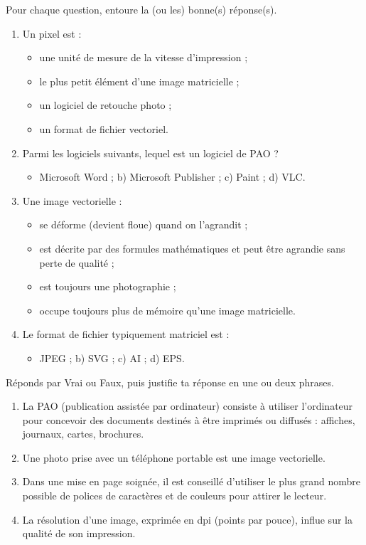 \documentclass[11pt]{article}
\newcommand{\cle}[1]{{\popxbold\color{popdark}#1}}
\begin{document}
\begin{exercice}
Pour chaque question, entoure la (ou les) bonne(s) réponse(s).
\begin{enumerate}
\item Un \cle{pixel} est :
\begin{itemize}
\item[a)] une unité de mesure de la vitesse d'impression ;
\item[b)] le plus petit élément d'une image matricielle ;
\item[c)] un logiciel de retouche photo ;
\item[d)] un format de fichier vectoriel.
\end{itemize}
\item Parmi les logiciels suivants, lequel est un logiciel de \cle{PAO} ?
\begin{itemize}
\item[a)] Microsoft Word ; b) Microsoft Publisher ; c) Paint ; d) VLC.
\end{itemize}
\item Une image \cle{vectorielle} :
\begin{itemize}
\item[a)] se déforme (devient floue) quand on l'agrandit ;
\item[b)] est décrite par des formules mathématiques et peut être agrandie sans perte de qualité ;
\item[c)] est toujours une photographie ;
\item[d)] occupe toujours plus de mémoire qu'une image matricielle.
\end{itemize}
\item Le format de fichier typiquement \cle{matriciel} est :
\begin{itemize}
\item[a)] JPEG ; b) SVG ; c) AI ; d) EPS.
\end{itemize}
\end{enumerate}
\end{exercice}

\begin{exercice}
Réponds par Vrai ou Faux, puis justifie ta réponse en une ou deux phrases.
\begin{enumerate}
\item La PAO (publication assistée par ordinateur) consiste à utiliser l'ordinateur pour concevoir des documents destinés à être imprimés ou diffusés : affiches, journaux, cartes, brochures.
\item Une photo prise avec un téléphone portable est une image vectorielle.
\item Dans une mise en page soignée, il est conseillé d'utiliser le plus grand nombre possible de polices de caractères et de couleurs pour attirer le lecteur.
\item La résolution d'une image, exprimée en dpi (points par pouce), influe sur la qualité de son impression.
\end{enumerate}
\end{exercice}
\end{document}
